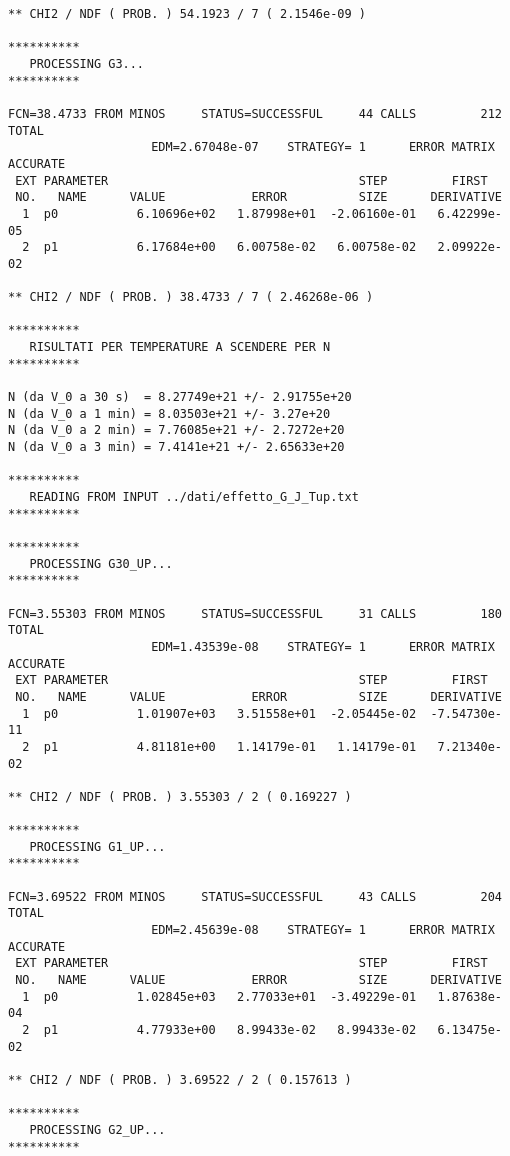 {\begin{verbatim}
** CHI2 / NDF ( PROB. ) 54.1923 / 7 ( 2.1546e-09 )

**********
   PROCESSING G3...
**********

FCN=38.4733 FROM MINOS     STATUS=SUCCESSFUL     44 CALLS         212 TOTAL
                    EDM=2.67048e-07    STRATEGY= 1      ERROR MATRIX ACCURATE 
 EXT PARAMETER                                   STEP         FIRST   
 NO.   NAME      VALUE            ERROR          SIZE      DERIVATIVE 
  1  p0           6.10696e+02   1.87998e+01  -2.06160e-01   6.42299e-05
  2  p1           6.17684e+00   6.00758e-02   6.00758e-02   2.09922e-02

** CHI2 / NDF ( PROB. ) 38.4733 / 7 ( 2.46268e-06 )

**********
   RISULTATI PER TEMPERATURE A SCENDERE PER N
**********

N (da V_0 a 30 s)  = 8.27749e+21 +/- 2.91755e+20
N (da V_0 a 1 min) = 8.03503e+21 +/- 3.27e+20
N (da V_0 a 2 min) = 7.76085e+21 +/- 2.7272e+20
N (da V_0 a 3 min) = 7.4141e+21 +/- 2.65633e+20

**********
   READING FROM INPUT ../dati/effetto_G_J_Tup.txt
**********

**********
   PROCESSING G30_UP...
**********

FCN=3.55303 FROM MINOS     STATUS=SUCCESSFUL     31 CALLS         180 TOTAL
                    EDM=1.43539e-08    STRATEGY= 1      ERROR MATRIX ACCURATE 
 EXT PARAMETER                                   STEP         FIRST   
 NO.   NAME      VALUE            ERROR          SIZE      DERIVATIVE 
  1  p0           1.01907e+03   3.51558e+01  -2.05445e-02  -7.54730e-11
  2  p1           4.81181e+00   1.14179e-01   1.14179e-01   7.21340e-02

** CHI2 / NDF ( PROB. ) 3.55303 / 2 ( 0.169227 )

**********
   PROCESSING G1_UP...
**********

FCN=3.69522 FROM MINOS     STATUS=SUCCESSFUL     43 CALLS         204 TOTAL
                    EDM=2.45639e-08    STRATEGY= 1      ERROR MATRIX ACCURATE 
 EXT PARAMETER                                   STEP         FIRST   
 NO.   NAME      VALUE            ERROR          SIZE      DERIVATIVE 
  1  p0           1.02845e+03   2.77033e+01  -3.49229e-01   1.87638e-04
  2  p1           4.77933e+00   8.99433e-02   8.99433e-02   6.13475e-02

** CHI2 / NDF ( PROB. ) 3.69522 / 2 ( 0.157613 )

**********
   PROCESSING G2_UP...
**********


\end{verbatim}}
